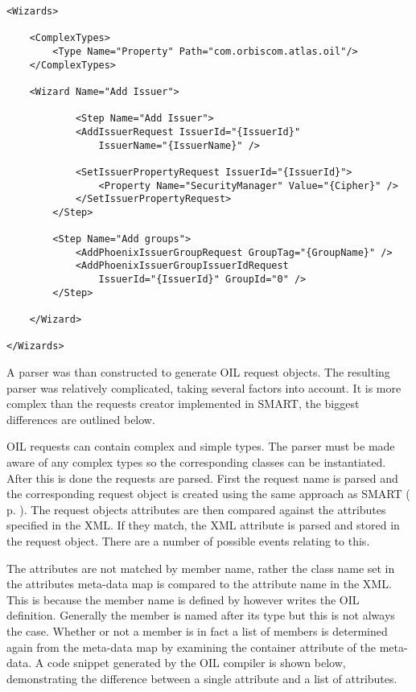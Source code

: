 \documentclass[a4paper, 11pt, titlepage]{article}
\begin{document}
\begin{verbatim} 
<Wizards> 
 
    <ComplexTypes> 
        <Type Name="Property" Path="com.orbiscom.atlas.oil"/> 
    </ComplexTypes> 
 
    <Wizard Name="Add Issuer"> 
 
            <Step Name="Add Issuer"> 
            <AddIssuerRequest IssuerId="{IssuerId}"
                IssuerName="{IssuerName}" /> 
 
            <SetIssuerPropertyRequest IssuerId="{IssuerId}"> 
                <Property Name="SecurityManager" Value="{Cipher}" /> 
            </SetIssuerPropertyRequest> 
        </Step> 
		 
        <Step Name="Add groups"> 
            <AddPhoenixIssuerGroupRequest GroupTag="{GroupName}" /> 
            <AddPhoenixIssuerGroupIssuerIdRequest 
                IssuerId="{IssuerId}" GroupId="0" />	 
        </Step> 
	 
    </Wizard> 
 
</Wizards> 
\end{verbatim} 
 
A parser was than constructed to generate OIL request objects. The resulting parser was relatively complicated, taking several factors into account. It is more complex than the requests creator implemented in SMART, the biggest differences are outlined below. 
 
OIL requests can contain complex and simple types. The parser must be made aware of any complex types so the corresponding classes can be instantiated. After this is done the requests are parsed. First the request name is parsed and the corresponding request object is created using the same approach as SMART ( p. \pageref{smart_dynamic_create} ). The request objects attributes are then compared against the attributes specified in the XML. If they match, the XML attribute is parsed and stored in the request object. There are a number of possible events relating to this. 
 
The attributes are not matched by member name, rather the class name set in the attributes meta-data map is compared to the attribute name in the XML. This is because the member name is defined by however writes the OIL definition. Generally the member is named after its type but this is not always the case. Whether or not a member is in fact a list of members is determined again from the meta-data map by examining the container attribute of the meta-data. A code snippet generated by the OIL compiler is shown below, demonstrating the difference between a single attribute and a list of attributes. 
 
\end{document}
